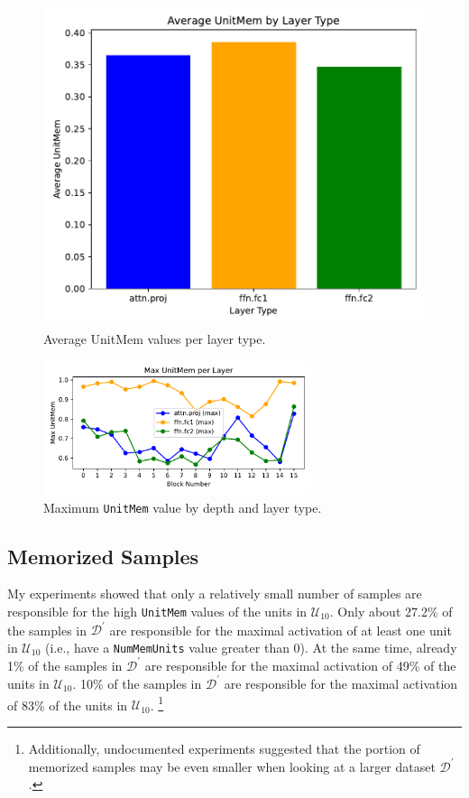 \documentclass{article} %
\begin{document}
\begin{figure}[ht]
\begin{minipage}{0.48\textwidth}
      \includegraphics[width=\textwidth]{figures/mem_avg_per_layer_type.pdf}
      \caption{Average UnitMem values per layer type.}
      \label{fig:mem_avg_per_layer_type}
   \end{minipage}
\end{figure}

\begin{figure}[ht]
   \centering
   \includegraphics[width=0.7\textwidth]{figures/mem_max_per_layer_num.pdf}
   \caption{Maximum \texttt{UnitMem} value by depth and layer type.}
   \label{fig:mem_max_per_layer_num}
\end{figure}

\subsection{Memorized Samples}
My experiments showed that only a relatively small number of samples are responsible for the high \texttt{UnitMem} values of the units in $\mathcal{U}_{10}$.
Only about 27.2\% of the samples in $\mathcal{D}^\prime$ are responsible for the maximal activation of at least one unit in $\mathcal{U}_{10}$ (i.e., have a \texttt{NumMemUnits} value greater than 0).
At the same time, already 1\% of the samples in $\mathcal{D}^\prime$ are responsible for the maximal activation of 49\% of the units in $\mathcal{U}_{10}$.
10\% of the samples in $\mathcal{D}^\prime$ are responsible for the maximal activation of 83\% of the units in $\mathcal{U}_{10}$.
\footnote{Additionally, undocumented experiments suggested that the portion of memorized samples may be even smaller when looking at a larger dataset $\mathcal{D}^\prime$.}
\end{document}
